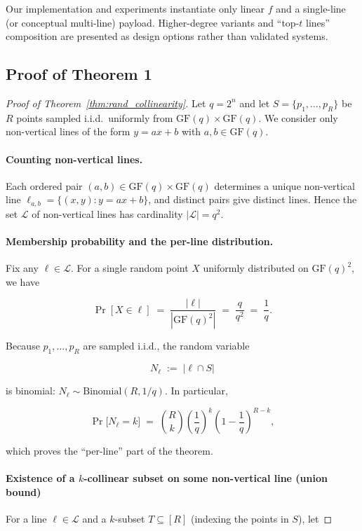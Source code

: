 \documentclass[a4paper,11pt]{llncs}
\newcommand{\GF}{\mathrm{GF}}
\newcommand{\cL}{\mathcal{L}}
\newcommand{\defeq}{:=}
\begin{document}
Our implementation and experiments instantiate only linear $f$ and a single-line (or conceptual multi-line) payload. Higher-degree variants and ``top-$t$ lines'' composition are presented as design options rather than validated systems. 


\subsection{Proof of Theorem 1}

\begin{proof}[Proof of Theorem~\ref{thm:rand_collinearity}]
Let $q=2^n$ and let $S=\{p_1,\ldots,p_R\}$ be $R$ points sampled i.i.d.\ uniformly from $\GF(q)\times\GF(q)$. We consider only non-vertical lines of the form $y=ax+b$ with $a,b\in\GF(q)$.

\paragraph{Counting non-vertical lines.}
Each ordered pair $(a,b)\in\GF(q)\times\GF(q)$ determines a unique non-vertical line $\ell_{a,b}=\{(x,y): y=ax+b\}$, and distinct pairs give distinct lines. Hence the set $\mathcal{L}$ of non-vertical lines has cardinality $|\mathcal{L}|=q^2$.

\paragraph{Membership probability and the per-line distribution.}
Fix any $\ell\in\cL$. For a single random point $X$ uniformly distributed on $\GF(q)^2$, we have

\[
    \Pr[X\in \ell] \;=\; \frac{|\ell|}{|\GF(q)^2|} \;=\; \frac{q}{q^2} \;=\; \frac{1}{q}.
\]

Because $p_1,\ldots,p_R$ are sampled i.i.d., the random variable

\[
    N_\ell \;\defeq\; |\ell \cap S|
\]

is binomial: $N_\ell \sim \mathrm{Binomial}(R,1/q)$. In particular,

\[
    \Pr\!\big[N_\ell = k\big] \;=\; \binom{R}{k}\left(\frac{1}{q}\right)^k\!\left(1-\frac{1}{q}\right)^{R-k},
\]

which proves the ``per-line'' part of the theorem.

\paragraph{Existence of a $k$-collinear subset on some non-vertical line (union bound)}
For a line $\ell\in\cL$ and a $k$-subset $T\subseteq [R]$ (indexing the points in $S$), let


\end{proof}
\end{document}

